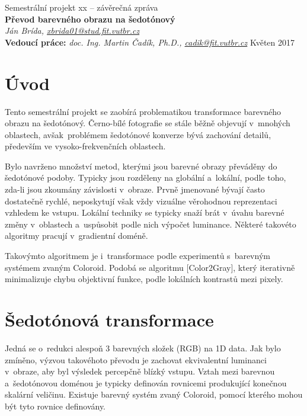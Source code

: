 \documentclass[11pt,a4paper,oneside]{article}
\begin{document}
	\thispagestyle{empty}
	\begin{center}
	\vspace*{60mm}
	{Semestrální projekt xx -- závěrečná zpráva }\\
	\smallskip
	{\Large\bf Převod barevného obrazu na šedotónový}\\
	\smallskip
	{\it Ján Brída, \url{xbrida01@stud.fit.vutbr.cz}}\\
	\vfill
	{\bf Vedoucí práce:} {\it doc. Ing. Martin Čadík, Ph.D., \url{cadik@fit.vutbr.cz}} 
	\hfill {Květen 2017}



	\end{center}
	\newpage


	\section{Úvod}
	Tento semestrální projekt se zaobírá problematikou transformace barevného obrazu
	na šedotónový. Černo-bílé fotografie se stále běžně objevují v~mnohých
	oblastech, avšak~problémem šedotónové konverze bývá zachování detailů, především
	ve vysoko-frekvenčních oblastech.

	Bylo navrženo množství metod, kterými jsou barevné obrazy převáděny do šedotónové podoby.
	Typicky jsou rozděleny na globální a~lokální, podle toho, zda-li jsou zkoumány závislosti
	v~obraze. Prvně jmenované bývají často dostatečně rychlé, neposkytují však vždy vizuálne
	věrohodnou reprezentaci vzhledem ke vstupu. Lokální techniky se typicky snaží brát v~úvahu
	barevné změny v~oblastech a~uspůsobit podle nich výpočet luminance. Některé takovéto
	algoritmy pracují v~gradientní doméně.

	Takovýmto algoritmem je i~transformace podle experimentů s~barevným systémem
	zvaným Coloroid. Podobá se algoritmu [Color2Gray], který iterativně minimalizuje
	chybu objektivní funkce, podle lokálních kontrastů mezi pixely.

	\section{Šedotónová transformace}
	Jedná se o~redukci alespoň 3 barevných složek (RGB) na 1D data.
	Jak bylo zmíněno, výzvou takovéhoto převodu je zachovat ekvivalentní
	luminanci v~obraze, aby byl výsledek percepčně blízký vstupu. Vztah mezi
	barevnou a~šedotónovou doménou je typicky definován rovnicemi produkující
	konečnou skalární veličinu. Existuje barevný systém zvaný Coloroid, pomocí
	kterého mohou být tyto rovnice definovány.
\end{document}
